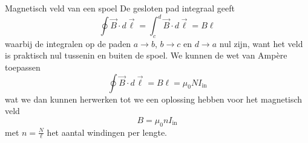 \begin{app}{Magnetisch veld van een spoel}
    \noindent De gesloten pad integraal geeft
    \begin{equation*}
        \oint \Vec{B} \cdot d\Vec{\ell} = \int_{c}^{d} \Vec{B} \cdot d\Vec{\ell} = B\ell
    \end{equation*}
    waarbij de integralen op de paden $a \to b$, $b \to c$ en $d \to a$ nul zijn, want het veld is praktisch nul tussenin en buiten de spoel. 
    We kunnen de wet van Ampère toepassen
    \begin{equation*}
        \oint \Vec{B} \cdot d\Vec{\ell} = B\ell = \mu_{0}NI_{\text{in}}
    \end{equation*}
    wat we dan kunnen herwerken tot we een oplossing hebben voor het magnetisch veld 
    \begin{equation*}
        B = \mu_{0}nI_{\text{in}}
    \end{equation*}
    met $n= \tfrac{N}{\ell}$ het aantal windingen per lengte.
    
\end{app}

